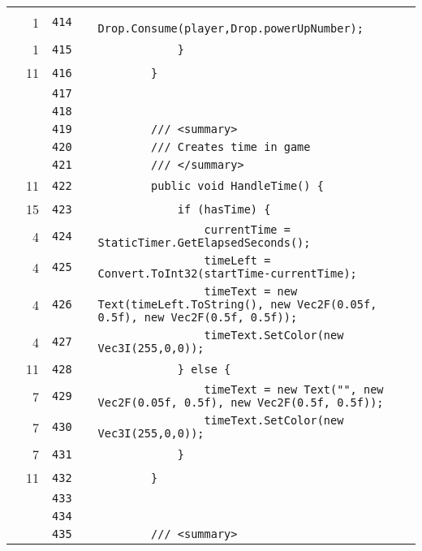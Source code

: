 \documentclass[a4paper,landscape,10pt]{article}
\begin{document}
\begin{longtable}[l]{lrrll}
\cellcolor{green} & 1 & \verb~414~ & & \verb~                Drop.Consume(player,Drop.powerUpNumber);~\\
\cellcolor{green} & 1 & \verb~415~ & & \verb~            }~\\
\cellcolor{green} & 11 & \verb~416~ & & \verb~        }~\\
\cellcolor{gray} &  & \verb~417~ & & \verb~~\\
\cellcolor{gray} &  & \verb~418~ & & \verb~~\\
\cellcolor{gray} &  & \verb~419~ & & \verb~        /// <summary>~\\
\cellcolor{gray} &  & \verb~420~ & & \verb~        /// Creates time in game~\\
\cellcolor{gray} &  & \verb~421~ & & \verb~        /// </summary>~\\
\cellcolor{green} & 11 & \verb~422~ & & \verb~        public void HandleTime() {~\\
\cellcolor{green} & 15 & \verb~423~ & & \verb~            if (hasTime) {~\\
\cellcolor{green} & 4 & \verb~424~ & & \verb~                currentTime = StaticTimer.GetElapsedSeconds();~\\
\cellcolor{green} & 4 & \verb~425~ & & \verb~                timeLeft = Convert.ToInt32(startTime-currentTime);~\\
\cellcolor{green} & 4 & \verb~426~ & & \verb~                timeText = new Text(timeLeft.ToString(), new Vec2F(0.05f, 0.5f), new Vec2F(0.5f, 0.5f));~\\
\cellcolor{green} & 4 & \verb~427~ & & \verb~                timeText.SetColor(new Vec3I(255,0,0));~\\
\cellcolor{green} & 11 & \verb~428~ & & \verb~            } else {~\\
\cellcolor{green} & 7 & \verb~429~ & & \verb~                timeText = new Text("", new Vec2F(0.05f, 0.5f), new Vec2F(0.5f, 0.5f));~\\
\cellcolor{green} & 7 & \verb~430~ & & \verb~                timeText.SetColor(new Vec3I(255,0,0));~\\
\cellcolor{green} & 7 & \verb~431~ & & \verb~            }~\\
\cellcolor{green} & 11 & \verb~432~ & & \verb~        }~\\
\cellcolor{gray} &  & \verb~433~ & & \verb~~\\
\cellcolor{gray} &  & \verb~434~ & & \verb~~\\
\cellcolor{gray} &  & \verb~435~ & & \verb~        /// <summary>~\\

\end{longtable}
\end{document}
